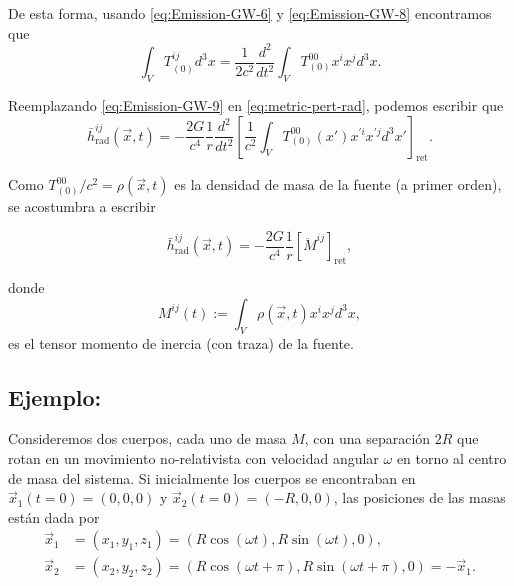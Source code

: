 \documentclass[letterpaper,11pt]{article}
\begin{document}
De esta forma, usando \eqref{eq:Emission-GW-6} y \eqref{eq:Emission-GW-8} encontramos que
\begin{equation}
\int_{V} T_{(0)}^{ij} d^3x = \frac{1}{2c^2} \frac{d^2}{dt^2} \int_{V} T_{(0)}^{00} x^{i} x^{j} d^3x. \label{eq:Emission-GW-9}
\end{equation}

Reemplazando \eqref{eq:Emission-GW-9} en \eqref{eq:metric-pert-rad}, podemos escribir que
\begin{equation}
\bar{h}^{ij}_{\text{rad}}(\vec{x},t) = - \frac{2G}{c^4} \frac{1}{r} \frac{d^2}{dt^2} \left[ \frac{1}{c^2} \int_{V} T_{(0)}^{00}(x') x^{'i} x^{'j} d^3x'\right]_{\text{ret}}.
\end{equation}

Como $T_{(0)}^{00}/c^2 = \rho(\vec{x},t)$ es la densidad de masa de la fuente (a primer orden), se acostumbra a escribir 
\begin{shaded}
\begin{equation}
\bar{h}^{ij}_{\text{rad}}(\vec{x},t) = - \frac{2G}{c^4} \frac{1}{r} \left[\ddot{M}^{ij} \right]_{\text{ret}}, \label{eq:metric-pert-rad}
\end{equation}
\end{shaded}
\noindent donde
\begin{equation}
M^{ij}(t) := \int_{V} \rho(\vec{x},t) x^{i} x^{j} d^3x,
\end{equation}
es el tensor momento de inercia (con traza) de la fuente. 

\subsection{Ejemplo:}

Consideremos dos cuerpos, cada uno de masa $M$, con una separación $2R$ que rotan en un movimiento no-relativista con velocidad angular $\omega$ en torno al centro de masa del sistema. Si inicialmente los cuerpos se encontraban en $\vec{x}_1(t = 0) = (0,0,0)$ y $\vec{x}_2(t = 0) = (-R,0,0)$, las posiciones de las masas están dada por
\begin{align}
\vec{x}_1 &= (x_1, y_1, z_1) = (R\cos(\omega t), R\sin(\omega t),0), \\
\vec{x}_2 &= (x_2, y_2, z_2) = (R\cos(\omega t + \pi), R\sin(\omega t + \pi),0) = - \vec{x}_1.
\end{align} 
\end{document}
